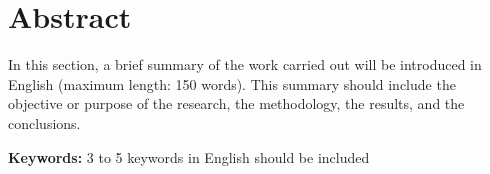 \chapter{Abstract}

In this section, a brief summary of the work carried out will be introduced in English (maximum length: 150 words). This summary should include the objective or purpose of the research, the methodology, the results, and the conclusions.

\textbf{Keywords:} 3 to 5 keywords in English should be included